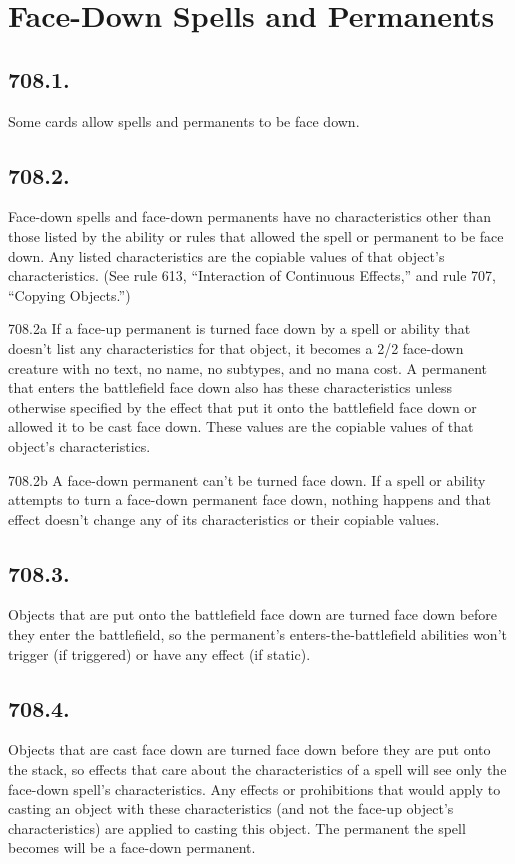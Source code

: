 \section{Face-Down Spells and Permanents}
\subsection*{708.1.}
Some cards allow spells and permanents to be face down.

\subsection*{708.2.}
Face-down spells and face-down permanents have no characteristics other than those listed by the ability or rules that allowed the spell or permanent to be face down. Any listed characteristics are the copiable values of that object’s characteristics. (See rule 613, “Interaction of Continuous Effects,” and rule 707, “Copying Objects.”)

708.2a If a face-up permanent is turned face down by a spell or ability that doesn’t list any characteristics for that object, it becomes a 2/2 face-down creature with no text, no name, no subtypes, and no mana cost. A permanent that enters the battlefield face down also has these characteristics unless otherwise specified by the effect that put it onto the battlefield face down or allowed it to be cast face down. These values are the copiable values of that object’s characteristics.

708.2b A face-down permanent can’t be turned face down. If a spell or ability attempts to turn a face-down permanent face down, nothing happens and that effect doesn’t change any of its characteristics or their copiable values.

\subsection*{708.3.}
Objects that are put onto the battlefield face down are turned face down before they enter the battlefield, so the permanent’s enters-the-battlefield abilities won’t trigger (if triggered) or have any effect (if static).

\subsection*{708.4.}
Objects that are cast face down are turned face down before they are put onto the stack, so effects that care about the characteristics of a spell will see only the face-down spell’s characteristics. Any effects or prohibitions that would apply to casting an object with these characteristics (and not the face-up object’s characteristics) are applied to casting this object. The permanent the spell becomes will be a face-down permanent.

